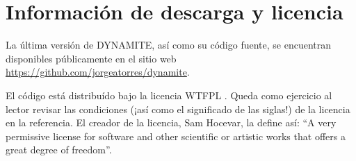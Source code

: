 \documentclass[11pt]{book}
\theoremstyle{definition}
\numberwithin{definition}{section}
\theoremstyle{theorem}
\numberwithin{theorem}{section}
\numberwithin{lemma}{section}
\numberwithin{corollary}{section}
\theoremstyle{plain}
\numberwithin{example}{section}
\begin{document}
\section{Información de descarga y licencia}

La última versión de DYNAMITE, así como su código fuente, se encuentran disponibles públicamente en el sitio web \url{https://github.com/jorgeatorres/dynamite}.

El código está distribuído bajo la licencia WTFPL \cite{wtfpl}. Queda como ejercicio al lector revisar las condiciones (¡así como el significado de las siglas!) de la licencia en la referencia. El creador de la licencia, Sam Hocevar, la define así: ``A very permissive license for software and other scientific or artistic works that offers a great degree of freedom''.

\nocite{*}
\printbibliography
\end{document}
